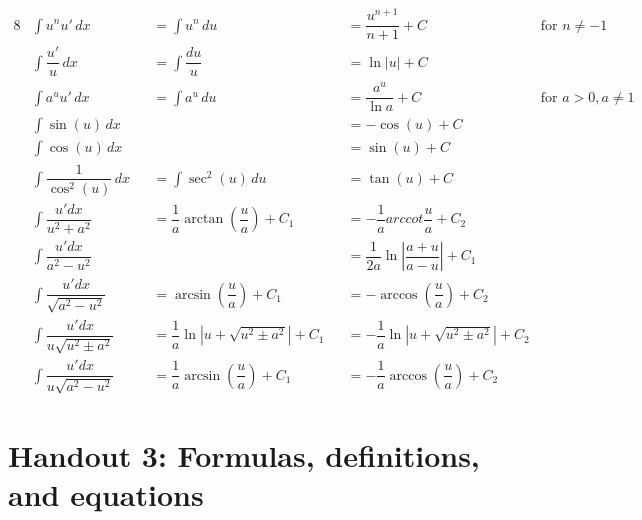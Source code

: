 \begin{alignat*}{8}
    &\int u^n u' \, dx  &&= \int u^n \, du 
    &&= \dfrac{u^{n+1}}{n+1} + C &\text{for } n \neq -1 \\
    &\int \dfrac{u'}{u} \, dx &&= \int \dfrac{du}{u} 
    &&= \ln|u| + C & \\
    &\int a^u u' \, dx &&= \int a^u \, du 
    &&= \dfrac{a^u}{\ln a} + C &\text{for } a > 0, a \neq 1 \\
    &\int \sin(u) \, dx && &&= -\cos(u) + C & \\
    &\int \cos(u) \, dx && &&= \sin(u) + C & \\
    &\int \dfrac{1}{\cos^2(u)} \, dx 
    &&= \int \sec^2(u) \, du &&= \tan(u) + C & \\
    &\int \dfrac{u'dx}{u^2+a^2} && = \dfrac{1}{a} \arctan\left(\dfrac{u}{a}\right) + C_1 
    &&= -\dfrac{1}{a}arccot\dfrac{u}{a} + C_2 & \\
    &\int \dfrac{u'dx}{a^2-u^2} && &&= \dfrac{1}{2a}\ln\left|\dfrac{a+u}{a-u}\right| + C_1\\
    &\int \dfrac{u'dx}{\sqrt{a^2-u^2}} &&= \arcsin\left(\dfrac{u}{a}\right) + C_1
    &&= -\arccos\left(\dfrac{u}{a}\right) + C_2 & \\
    &\int \dfrac{u'dx}{u\sqrt{u^2\pm a^2}} &&= \dfrac{1}{a}\ln\left|u+\sqrt{u^2\pm a^2}\right| + C_1
    &&= -\dfrac{1}{a}\ln\left|u+\sqrt{u^2\pm a^2}\right| + C_2 & \\
    &\int \dfrac{u'dx}{u\sqrt{a^2-u^2}} &&= \dfrac{1}{a}\arcsin\left(\dfrac{u}{a}\right) + C_1 &&= -\dfrac{1}{a}\arccos\left(\dfrac{u}{a}\right) + C_2
\end{alignat*}

\section{Handout 3: Formulas, definitions, and equations}
